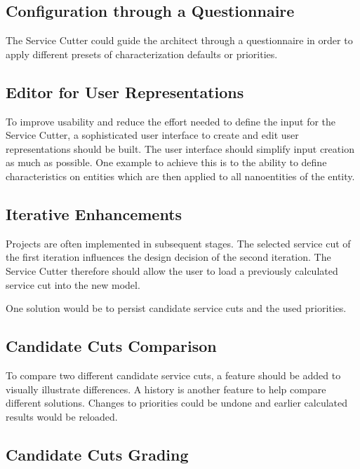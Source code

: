 \subsection{Configuration through a Questionnaire}

The Service Cutter could guide the architect through a questionnaire in order to apply different presets of characterization defaults or priorities.

\subsection{Editor for User Representations}

To improve usability and reduce the effort needed to define the input for the Service Cutter, a sophisticated user interface to create and edit user representations should be built. The user interface should simplify input creation as much as possible. One example to achieve this is to the ability to define characteristics on entities which are then applied to all nanoentities of the entity. 

\subsection{Iterative Enhancements}

Projects are often implemented in subsequent stages. The selected service cut of the first iteration influences the design decision of the second iteration. The Service Cutter therefore should allow the user to load a previously calculated service cut into the new model.

One solution would be to persist candidate service cuts and the used priorities. 

\subsection{Candidate Cuts Comparison}

To compare two different candidate service cuts, a feature should be added to visually illustrate differences. A history is another feature to help compare different solutions. Changes to priorities could be undone and earlier calculated results would be reloaded.

\subsection{Candidate Cuts Grading}
\label{sec:suggested-cut-grades}

